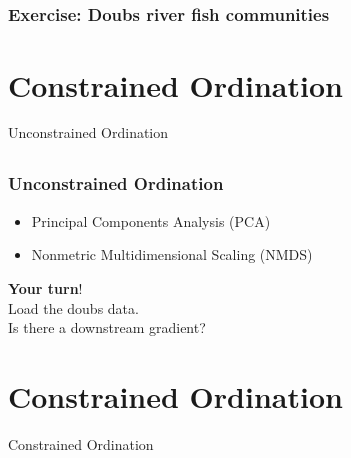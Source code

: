 \documentclass[9pt, compress]{beamer}\usepackage[]{graphicx}\usepackage[]{color}
\begin{document}
\subsection{}
\begin{frame}
\frametitle{Exercise: Doubs river fish communities}
\end{frame}



\section{Constrained Ordination}
\begin{frame}[plain]{}
\begin{center}
  \Huge \color{title} Unconstrained Ordination
\end{center}
\end{frame}


\subsection{}
\begin{frame}
\frametitle{Unconstrained Ordination}
\begin{itemize}
  \item Principal Components Analysis (PCA)
  \item Nonmetric Multidimensional Scaling (NMDS)
\end{itemize}
\end{frame}



\bgroup
{}
\begin{frame}[plain]{}
\begin{center}
  \color{background}
  \Huge \textbf{Your turn}! \\[1em]
  \large
  Load the doubs data. \\
  Is there a downstream gradient?
\end{center}
\end{frame}
\egroup


\section{Constrained Ordination}
\begin{frame}[plain]{}
\begin{center}
  \Huge \color{title} Constrained Ordination
\end{center}
\end{frame}
\end{document}
